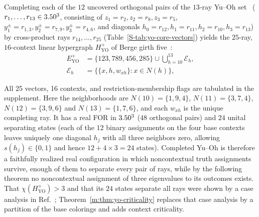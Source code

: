 \documentclass[aps,pra,reprint,superscriptaddress,longbibliography,nofootinbib,floatfix,10pt]{revtex4-2}
\theoremstyle{definition}\newtheorem{definition}[theorem]{Definition}
\theoremstyle{remark}\newtheorem{remark}[theorem]{Remark}
\newcommand{\YO}{\mathrm{YO}}\newcommand{\ip}[2]{\langle #1,#2\rangle}
\begin{document}
Completing each of the $12$ uncovered orthogonal pairs of the $13$-ray Yu--Oh set~\cite{Yu-2012} ($r_1,\ldots,r_{13}\in3.50^3$, consisting of $z_1=r_2,z_2=r_8,z_3=r_5$, $y_1^\pm=r_{1,3},y_2^\pm=r_{7,9},y_3^\pm=r_{4,6}$, and diagonals $h_0=r_{12},h_1=r_{11},h_2=r_{10},h_3=r_{13}$) by cross-product rays $r_{14},\ldots,r_{25}$ (Table~\ref{S-tab:yo-core-vectors}) yields the $25$-ray, $16$-context linear hypergraph $H_{\YO}^{+}$ of Berge girth five~\cite{Pavi_i__2019,svozil-2025-color}:
\begin{equation}\label{m:eq:yuo-blocks}
\begin{aligned}
E_{\YO}^{+}&=\{123,789,456,285\}\cup\bigcup_{h=10}^{13}\mathcal E_h,\\
\mathcal E_h&=\{\{x,h,w_{xh}\}:x\in N(h)\},
\end{aligned}
\end{equation}

All 25 vectors, 16 contexts, and restriction-membership flags are tabulated in the supplement.
Here the neighborhoods are $N(10)=\{1,9,4\}$, $N(11)=\{3,7,4\}$, $N(12)=\{3,9,6\}$ and $N(13)=\{1,7,6\}$, and each $w_{xh}$ is the unique completing ray. It has a real FOR in $3.50^3$ ($48$ orthogonal pairs) and $24$ unital separating states (each of the $12$ binary assignments on the four base contexts leaves uniquely one diagonal $h_j$ with all three neighbors zero, allowing $s(h_j)\in\{0,1\}$ and hence $12+4\times3=24$ states). Completed Yu--Oh is therefore a faithfully realized real configuration in which noncontextual truth assignments survive, enough of them to separate every pair of rays, while by the following theorem no noncontextual assignment of three eigenvalues to its outcomes exists. That $\chi(H_{\YO}^{+})>3$ and that its $24$ states separate all rays were shown by a case analysis in Ref.~\cite{svozil-2025-color}; Theorem~\ref{m:thm:yo-criticality} replaces that case analysis by a partition of the base colorings and adds context criticality.
\end{document}
